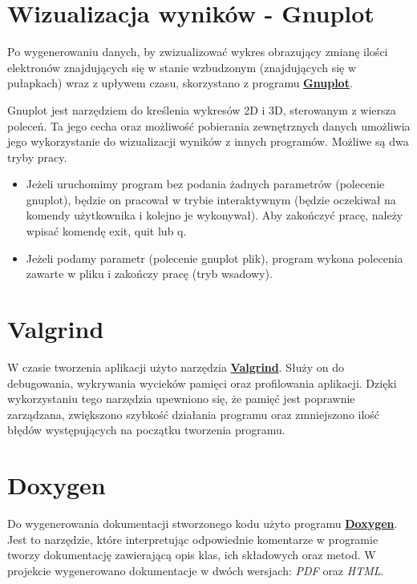 \section{Wizualizacja wyników - Gnuplot}

Po wygenerowaniu danych, by zwizualizować wykres obrazujący zmianę ilości elektronów znajdujących się w stanie wzbudzonym (znajdujących się w pułapkach) wraz z upływem czasu, skorzystano z programu \href{http://www.gnuplot.info/}{\textbf{Gnuplot}}.

Gnuplot jest narzędziem do kreślenia wykresów 2D i 3D, sterowanym z wiersza poleceń. Ta jego cecha oraz możliwość pobierania zewnętrznych danych umożliwia jego wykorzystanie do wizualizacji wyników z innych programów. Możliwe są dwa tryby pracy.
\begin{itemize}
\item Jeżeli uruchomimy program bez podania żadnych parametrów (polecenie gnuplot), będzie on pracował w trybie interaktywnym (będzie oczekiwał na komendy użytkownika i kolejno je wykonywał). Aby zakończyć pracę, należy wpisać komendę exit, quit lub q.
\item Jeżeli podamy parametr (polecenie gnuplot plik), program wykona polecenia zawarte w pliku i zakończy pracę (tryb wsadowy).
\end{itemize}

\section{Valgrind}
W czasie tworzenia aplikacji użyto narzędzia \href{http://valgrind.org/}{\textbf{Valgrind}}. Służy on do debugowania, wykrywania wycieków pamięci oraz profilowania aplikacji. Dzięki wykorzystaniu tego narzędzia upewniono się, że pamięć jest poprawnie zarządzana, zwiększono szybkość działania programu oraz zmniejszono ilość błędów występujących na początku tworzenia programu.
\section{Doxygen}
\label{tech:doxy}
Do wygenerowania dokumentacji stworzonego kodu użyto programu \href{http://www.doxygen.nl/}{\textbf{Doxygen}}. Jest to narzędzie, które interpretując odpowiednie komentarze w programie tworzy dokumentację zawierającą opis klas, ich składowych oraz metod. W projekcie wygenerowano dokumentacje w dwóch wersjach: \textit{PDF} oraz \textit{HTML}.